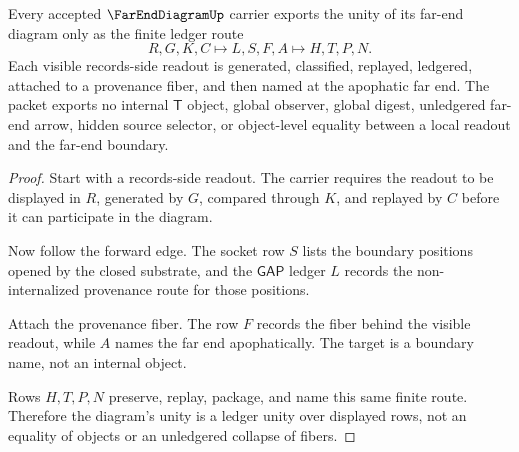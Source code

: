 \begin{theorem}
\label{thm:far-end-diagram-ledger-unity}
Every accepted $\FarEndDiagramUp$ carrier exports the unity of its far-end diagram only as the finite ledger route
$$
R,G,K,C \longmapsto L,S,F,A \longmapsto H,T,P,N .
$$
Each visible records-side readout is generated, classified, replayed, ledgered, attached to a provenance fiber, and then named at the apophatic far end. The packet exports no internal $\mathsf{T}$ object, global observer, global digest, unledgered far-end arrow, hidden source selector, or object-level equality between a local readout and the far-end boundary.
\end{theorem}
\begin{proof}
Start with a records-side readout. The carrier requires the readout to be displayed in $R$, generated by $G$, compared through $K$, and replayed by $C$ before it can participate in the diagram.

Now follow the forward edge. The socket row $S$ lists the boundary positions opened by the closed substrate, and the $\mathsf{GAP}$ ledger $L$ records the non-internalized provenance route for those positions.

Attach the provenance fiber. The row $F$ records the fiber behind the visible readout, while $A$ names the far end apophatically. The target is a boundary name, not an internal object.

Rows $H,T,P,N$ preserve, replay, package, and name this same finite route. Therefore the diagram's unity is a ledger unity over displayed rows, not an equality of objects or an unledgered collapse of fibers.
\end{proof}


\begin{closurestatus}{\FarEndDiagramUp}
  \theoryclosure{\seedClosure}
  \formalstatus{\theoremCheckedV}
\end{closurestatus}
